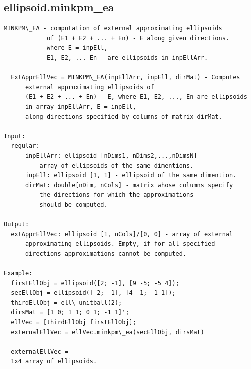 \documentclass[letterpaper,10pt,english]{sphinxmanual}
\begin{document}
\subsection{ellipsoid.minkpm\_ea}
\label{chap_functions:ellipsoid-minkpm-ea}
\begin{Verbatim}[commandchars=\\\{\}]
MINKPM\_EA - computation of external approximating ellipsoids
            of (E1 + E2 + ... + En) - E along given directions.
            where E = inpEll,
            E1, E2, ... En - are ellipsoids in inpEllArr.

  ExtApprEllVec = MINKPM\_EA(inpEllArr, inpEll, dirMat) - Computes
      external approximating ellipsoids of
      (E1 + E2 + ... + En) - E, where E1, E2, ..., En are ellipsoids
      in array inpEllArr, E = inpEll,
      along directions specified by columns of matrix dirMat.

Input:
  regular:
      inpEllArr: ellipsoid [nDims1, nDims2,...,nDimsN] -
          array of ellipsoids of the same dimentions.
      inpEll: ellipsoid [1, 1] - ellipsoid of the same dimention.
      dirMat: double[nDim, nCols] - matrix whose columns specify
          the directions for which the approximations
          should be computed.

Output:
  extApprEllVec: ellipsoid [1, nCols]/[0, 0] - array of external
      approximating ellipsoids. Empty, if for all specified
      directions approximations cannot be computed.

Example:
  firstEllObj = ellipsoid([2; -1], [9 -5; -5 4]);
  secEllObj = ellipsoid([-2; -1], [4 -1; -1 1]);
  thirdEllObj = ell\_unitball(2);
  dirsMat = [1 0; 1 1; 0 1; -1 1]';
  ellVec = [thirdEllObj firstEllObj];
  externalEllVec = ellVec.minkpm\_ea(secEllObj, dirsMat)

  externalEllVec =
  1x4 array of ellipsoids.
\end{Verbatim}
\end{document}
